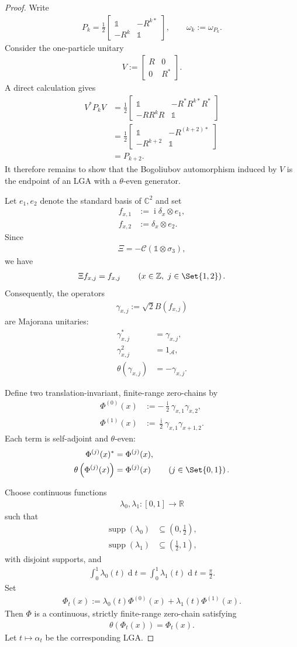 \documentclass[a4paper,10pt]{article}
\numberwithin{equation}{section}
\theoremstyle{plain}
\theoremstyle{plain}
\theoremstyle{plain}
\theoremstyle{plain}
\theoremstyle{plain}
\theoremstyle{remark}
\theoremstyle{definition}
\newcommand{\ii}{\operatorname{i}}
\newcommand{\ZZ}{\mathbb{Z}}
\newcommand{\RR}{\mathbb{R}}
\newcommand{\CC}{\mathbb{C}}
\newcommand{\calA}{\mathcal{A}}
\newcommand{\calC}{\mathcal{C}}
\newcommand{\dif}{\operatorname{d}\!} %
\newcommand{\Id}{\mathds{1}}
\newcommand{\supp}{\operatorname{supp}}
\newcommand{\eq}[1]{\begin{align*}#1\end{align*}}
\newcommand{\br}[1]{\left(#1\right)}
\begin{document}
\begin{proof}
Write
\eq{
P_k
=
\frac{1}{2}
\begin{bmatrix}
\Id & -R^{k\ast}\\
-R^k & \Id
\end{bmatrix},
\qquad
\omega_k
:=
\omega_{P_k}.
}
Consider the one-particle unitary
\eq{
V
:=
\begin{bmatrix}
R & 0\\
0 & R^\ast
\end{bmatrix}.
}
A direct calculation gives
\eq{
V^\ast P_kV
&=
\frac{1}{2}
\begin{bmatrix}
\Id
&
-R^\ast R^{k\ast}R^\ast
\\
-RR^kR
&
\Id
\end{bmatrix}\\
&=
\frac{1}{2}
\begin{bmatrix}
\Id
&
-R^{(k+2)\ast}
\\
-R^{k+2}
&
\Id
\end{bmatrix}\\
&=
P_{k+2}.
}
It therefore remains to show that the Bogoliubov automorphism induced by
$V$ is the endpoint of an LGA with a $\theta$-even generator.

Let $e_1,e_2$ denote the standard basis of $\CC^2$ and set
\eq{
f_{x,1}
&:=
\ii\delta_x\otimes e_1,\\
f_{x,2}
&:=
\delta_x\otimes e_2.
}
Since
\eq{
\Xi
=
-\calC\br{\Id\otimes\sigma_3},
}
we have
\eq{
\Xi f_{x,j}
=
f_{x,j}
\qquad
\br{
x\in\ZZ,\ 
j\in\Set{1,2}
}.
}
Consequently, the operators
\eq{
\gamma_{x,j}
:=
\sqrt{2}B(f_{x,j})
}
are Majorana unitaries:
\eq{
\gamma_{x,j}^\ast
&=
\gamma_{x,j},\\
\gamma_{x,j}^2
&=
1_{\calA},\\
\theta\br{\gamma_{x,j}}
&=
-\gamma_{x,j}.
}

Define two translation-invariant, finite-range zero-chains by
\eq{
\Phi^{(0)}(x)
&:=
-\frac{\ii}{2}
\gamma_{x,1}\gamma_{x,2},\\
\Phi^{(1)}(x)
&:=
\frac{\ii}{2}
\gamma_{x,1}\gamma_{x+1,2}.
}
Each term is self-adjoint and $\theta$-even:
\eq{
\Phi^{(j)}(x)^\ast
&=
\Phi^{(j)}(x),\\
\theta\br{\Phi^{(j)}(x)}
&=
\Phi^{(j)}(x)
\qquad
\br{
j\in\Set{0,1}
}.
}

Choose continuous functions
\eq{
\lambda_0,\lambda_1
:
[0,1]
\longrightarrow
\RR
}
such that
\eq{
\supp(\lambda_0)
&\subseteq
\br{
0,\frac{1}{2}
},\\
\supp(\lambda_1)
&\subseteq
\br{
\frac{1}{2},1
},
}
with disjoint supports, and
\eq{
\int_0^1\lambda_0(t)\dif t
=
\int_0^1\lambda_1(t)\dif t
=
\frac{\pi}{2}.
}
Set
\eq{
\Phi_t(x)
:=
\lambda_0(t)\Phi^{(0)}(x)
+
\lambda_1(t)\Phi^{(1)}(x).
}
Then $\Phi$ is a continuous, strictly finite-range zero-chain satisfying
\eq{
\theta\br{\Phi_t(x)}
=
\Phi_t(x).
}
Let $t\mapsto\alpha_t$ be the corresponding LGA.


\end{proof}
\end{document}
